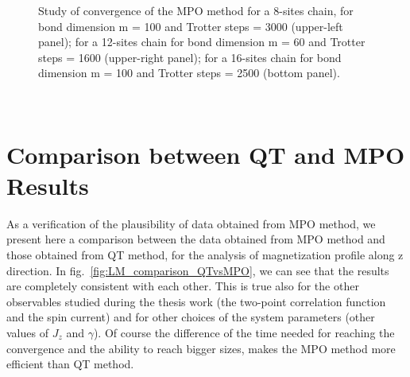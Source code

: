 \begin{figure}[H]
\captionsetup{width=1.\linewidth}
\caption{Study of convergence of the MPO method for a 8-sites chain, for bond dimension m = 100 and Trotter steps = 3000 (upper-left panel); for a 12-sites chain for bond dimension m = 60 and Trotter steps = 1600 (upper-right panel); for a 16-sites chain for bond dimension m = 100 and Trotter steps = 2500 (bottom panel).}
\label{fig:convergence_8_12_16}
\end{figure}
\\

\pagebreak
\section{Comparison between QT and MPO Results}
As a verification of the plausibility of data obtained from MPO method, we present here a comparison between the data obtained from MPO method and those obtained from QT method, for the analysis of magnetization profile along z direction. In fig.~\ref{fig:LM_comparison_QTvsMPO}, we can see that the results are completely consistent with each other. This is true also for the other observables studied during the thesis work (the two-point correlation function and the spin current) and for other choices of the system parameters (other values of $J_z$ and $\gamma$). Of course the difference of the time needed for reaching the convergence and the ability to reach bigger sizes, makes the MPO method more efficient than QT method.

